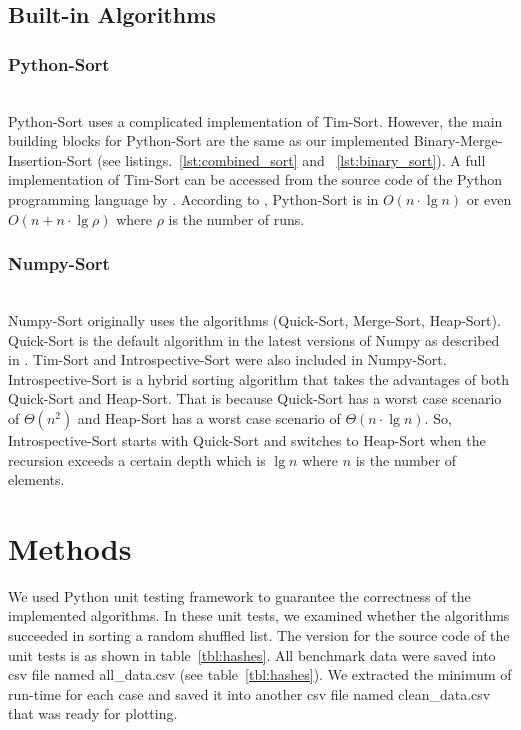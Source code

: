 \documentclass[sigconf, nonacm, natbib, screen, balance=False]{acmart}
\begin{document}
\subsection{Built-in Algorithms}
\subsubsection{Python-Sort}\label{sec:python}
\hfill\\
Python-Sort uses a complicated implementation of Tim-Sort. However, the main building blocks for Python-Sort are the same as our implemented Binary-Merge-Insertion-Sort (see listings.~\ref{lst:combined_sort} and ~\ref{lst:binary_sort}). A full implementation of Tim-Sort can be accessed from the source code of the Python programming language by \citet{cpythonsourcecode}. According to \citet{NicolasAuger}, Python-Sort is in $O(n \cdot \lg n)$ or even $O(n + n \cdot \lg \rho)$ where $\rho$ is the number of runs.  

\subsubsection{Numpy-Sort}\label{sec:numpy}
\hfill\\
Numpy-Sort originally uses the algorithms (Quick-Sort, Merge-Sort, Heap-Sort). Quick-Sort is the default algorithm in the latest versions of Numpy as described in \citet{harris2020array}. Tim-Sort and Introspective-Sort were also included in Numpy-Sort. Introspective-Sort is a hybrid sorting algorithm that takes the advantages of both Quick-Sort and Heap-Sort. That is because Quick-Sort has a worst case scenario of $\Theta(n^2)$ and Heap-Sort has a worst case scenario of $\Theta(n\cdot\lg n)$. So, Introspective-Sort starts with Quick-Sort and switches to Heap-Sort when the recursion exceeds a certain depth which is $\lg n$ where $n$ is the number of elements.

\section{Methods}\label{sec:methods}
We used Python unit testing framework to guarantee the correctness of the implemented algorithms. In these unit tests, we examined whether the algorithms succeeded in sorting a random shuffled list. The version for the source code of the unit tests is as shown in table~\ref{tbl:hashes}. All benchmark data were saved into csv file named all\_data.csv (see table~\ref{tbl:hashes}). We extracted the minimum of run-time for each case and saved it into another csv file named clean\_data.csv that was ready for plotting.
\end{document}
